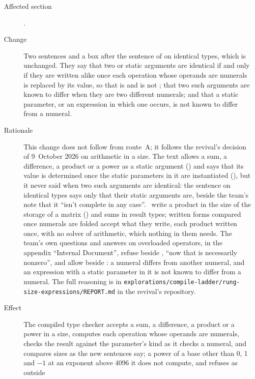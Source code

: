 \begin{description}
\item[Affected section] .
\item[Change] Two sentences and a box after the sentence of 
on identical types, which is unchanged.
They say that two  or  static arguments are identical if
and only if they are written alike once each operation whose operands are
numerals is replaced by its value, so that  is  and
 is not ; that two such arguments are known
to differ when they are two different numerals; and that a static parameter,
or an expression in which one occurs, is not known to differ from a numeral.
\item[Rationale] This change does not follow from route~A; it follows the
revival's decision of 9~October 2026 on arithmetic in a size.
The text allows a sum, a difference, a product or a power as a static
argument () and says that its value is determined
once the static parameters in it are instantiated (),
but it never said when two such arguments are identical: the sentence on
identical types says only that their static arguments are, beside the team's
note that it ``isn't complete in any case''.
\library\ write a product in the size of the storage of a matrix
()
and sums in result types; written forms compared once numerals are folded
accept what they write, each product written once, with no solver of
arithmetic, which nothing in them needs.
The team's own questions and answers on overloaded operators, in the appendix
``Internal Document'', refuse 
beside , ``now that  is
necessarily nonzero'', and allow  beside
: a numeral differs from another numeral, and an
expression with a static parameter in it is not known to differ from a numeral.
The full reasoning is in
\nolinkurl{explorations/compile-ladder/rung-size-expressions/REPORT.md}
in the revival's repository.
\item[Effect] The compiled type checker accepts a sum, a difference, a product
or a power in a size, computes each operation whose operands are numerals,
checks the result against the parameter's kind as it checks a numeral, and
compares sizes as the new sentences say; a power of a base other than 0, 1
and $-1$ at an exponent above 4096 it does not compute, and refuses as outside

\end{description}
